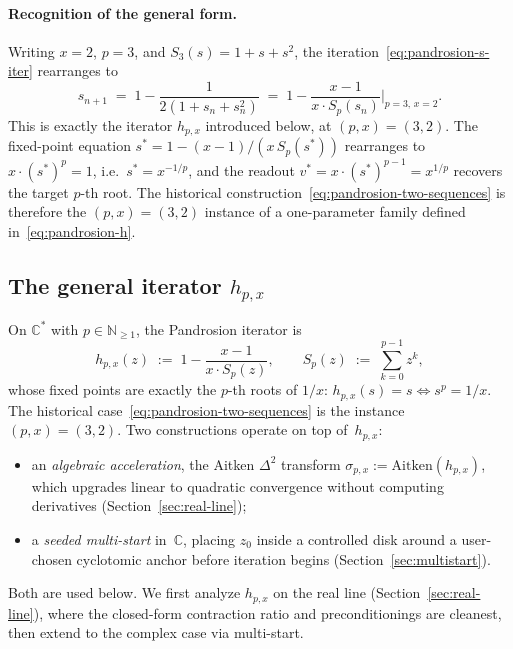 \documentclass[11pt,a4paper]{article}
\theoremstyle{definition}
\theoremstyle{remark}
\begin{document}
\paragraph{Recognition of the general form.} Writing
$x = 2$, $p = 3$, and $S_3(s) = 1 + s + s^{2}$, the
iteration~\eqref{eq:pandrosion-s-iter} rearranges to
\[
  s_{n+1} \;=\; 1 - \frac{1}{2(1 + s_n + s_n^{2})}
           \;=\; 1 - \frac{x - 1}{x \cdot S_p(s_n)}\bigg|_{p = 3,\, x = 2}.
\]
This is exactly the iterator $h_{p,x}$ introduced below, at
$(p, x) = (3, 2)$. The fixed-point equation $s^\ast = 1 - (x-1)/(x\,S_p(s^\ast))$
rearranges to $x \cdot (s^\ast)^p = 1$, i.e.\ $s^\ast = x^{-1/p}$, and
the readout $v^\ast = x \cdot (s^\ast)^{p-1} = x^{1/p}$ recovers the
target $p$-th root. The historical
construction~\eqref{eq:pandrosion-two-sequences} is therefore the
$(p, x) = (3, 2)$ instance of a one-parameter family defined in~\eqref{eq:pandrosion-h}.

\subsection{The general iterator $h_{p,x}$}
\label{sec:general-iterator}

On $\mathbb{C}^\ast$ with $p \in \mathbb{N}_{\geq 1}$, the Pandrosion
iterator is
\begin{equation}\label{eq:pandrosion-h}
  h_{p,x}(z) \;:=\; 1 - \frac{x-1}{x \cdot S_p(z)},
  \qquad
  S_p(z) \;:=\; \sum_{k=0}^{p-1} z^k,
\end{equation}
whose fixed points are exactly the $p$-th roots of $1/x$:
$h_{p,x}(s) = s \iff s^p = 1/x$. The historical
case~\eqref{eq:pandrosion-two-sequences} is the instance
$(p, x) = (3, 2)$. Two constructions operate on top of~$h_{p,x}$:
\begin{itemize}
\item an \emph{algebraic acceleration}, the Aitken $\Delta^2$ transform
  $\sigma_{p,x} := \mathrm{Aitken}(h_{p,x})$, which upgrades linear to
  quadratic convergence without computing derivatives
  (Section~\ref{sec:real-line});
\item a \emph{seeded multi-start} in~$\mathbb{C}$, placing $z_0$ inside
  a controlled disk around a user-chosen cyclotomic anchor before
  iteration begins (Section~\ref{sec:multistart}).
\end{itemize}
Both are used below. We first analyze $h_{p,x}$ on the real line
(Section~\ref{sec:real-line}), where the closed-form contraction ratio
and preconditionings are cleanest, then extend to the complex case
via multi-start.
\end{document}
